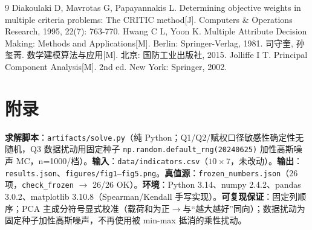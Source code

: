\documentclass[12pt,a4paper]{ctexart}
\begin{document}
\begin{thebibliography}{9}
 Diakoulaki D, Mavrotas G, Papayannakis L. Determining objective weights in multiple criteria problems: The CRITIC method[J]. Computers \& Operations Research, 1995, 22(7): 763-770.
 Hwang C L, Yoon K. Multiple Attribute Decision Making: Methods and Applications[M]. Berlin: Springer-Verlag, 1981.
 司守奎, 孙玺菁. 数学建模算法与应用[M]. 北京: 国防工业出版社, 2015.
 Jolliffe I T. Principal Component Analysis[M]. 2nd ed. New York: Springer, 2002.
\end{thebibliography}

\appendix
\section{附录}

\textbf{求解脚本}：\texttt{artifacts/solve.py}（纯 Python；Q1/Q2/赋权口径敏感性确定性无随机，Q3 数据扰动用固定种子 \texttt{np.random.default\_rng(20240625)} 加性高斯噪声 MC，n=1000/档）。\textbf{输入}：\texttt{data/indicators.csv}（$10\times7$，未改动）。\textbf{输出}：\texttt{results.json}、\texttt{figures/fig1--fig5.png}。\textbf{真值源}：\texttt{frozen\_numbers.json}（26 项，\texttt{check\_frozen} $\rightarrow$ 26/26 OK）。\textbf{环境}：Python 3.14、numpy 2.4.2、pandas 3.0.2、matplotlib 3.10.8（Spearman/Kendall 手写实现）。\textbf{可复现保证}：固定列顺序；PCA 主成分符号显式校准（载荷和为正$\rightarrow$与``越大越好''同向）；数据扰动为固定种子加性高斯噪声，不再使用被 min-max 抵消的乘性扰动。
\end{document}
